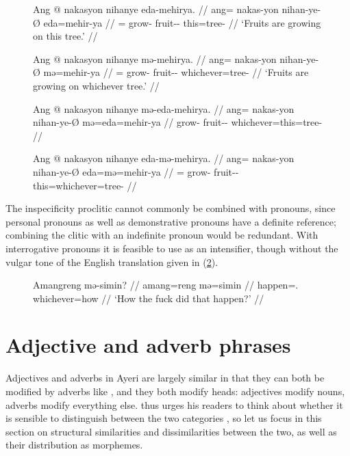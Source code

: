 \begin{figure}
\pex\label{ex:inspecdeix}
\a\label{ex:inspecdeix_1}\begingl
	\gla Ang @ nakasyon nihanye eda-mehirya. //
	\glb ang= nakas-yon nihan-ye-Ø eda=mehir-ya //
	\glc \AgtT{}= grow-\TplN{} fruit-\Pl{}-\Top{} this=tree-\Loc{} //
	\glft `Fruits are growing on this tree.' //
\endgl

\a\label{ex:inspecdeix_2}\begingl
	\gla Ang @ nakasyon nihanye mə-mehirya. //
	\glb ang= nakas-yon nihan-ye-Ø mə=mehir-ya //
	\glc \AgtT{}= grow-\TplN{} fruit-\Pl{}-\Top{} whichever=tree-\Loc{} //
	\glft `Fruits are growing on whichever tree.' //
\endgl

\a\ljudge*\label{ex:inspecdeix_3}\begingl
	\gla Ang @ nakasyon nihanye mə-eda-mehirya. //
	\glb ang= nakas-yon nihan-ye-Ø mə=eda=mehir-ya //
	\glc \AgtT{} grow-\TplN{} fruit-\Pl{}-\Top{} whichever=this=tree-\Loc{} //
\endgl

\a\ljudge*\label{ex:inspecdeix_4}\begingl
	\gla Ang @ nakasyon nihanye eda-mə-mehirya. //
	\glb ang= nakas-yon nihan-ye-Ø eda=mə=mehir-ya //
	\glc \AgtT{}= grow-\TplN{} fruit-\Pl{}-\Top{} this=whichever=tree-\Loc{} //
\endgl

\xe
\end{figure}

The inspecificity proclitic  cannot commonly be combined with
pronouns, since personal pronouns as well as demonstrative pronouns have a
definite reference; combining the clitic with an indefinite pronoun would be
redundant. With interrogative pronouns it is feasible to use  as
an intensifier, though without the vulgar tone of the English translation given
in (\ref{ex:meinter}).

\begin{figure}[h]
\ex\label{ex:meinter}\begingl
	\gla Amangreng mə-simin? //
	\glb amang=reng mə=simin //
	\glc happen=\TsgI{}.\Aarg{} whichever=how //
	\glft `How the fuck did that happen?' //
\endgl\xe
\end{figure}


\section{Adjective and adverb phrases}
\label{sec:adjps-advps}

Adjectives and adverbs in Ayeri are largely similar in that they can both be
modified by adverbs like , and they both modify heads: adjectives
modify nouns, adverbs modify everything else. \citet{carnie2013} thus urges his
readers to think about whether it is sensible to distinguish between the two
categories \citep[51]{carnie2013}, so let us focus in this section on
structural similarities and dissimilarities between the two, as well as their
distribution as morphemes.

